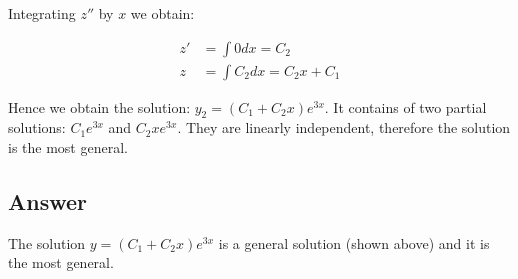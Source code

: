 Integrating $z''$ by $x$ we obtain:

\begin{displaymath}
    \begin{aligned}
        z' & = \int 0 dx = C_2 \\
        z & = \int C_2 dx = C_2 x + C_1
    \end{aligned}
\end{displaymath}

Hence we obtain the solution: $y_2 = (C_1 + C_2x)e^{3x}$. It contains of two partial solutions: $C_1 e^{3x}$ and $C_2x e^{3x}$. They are linearly independent, therefore the solution is the most general.

\subsection*{Answer}

The solution $y = (C_1 + C_2x)e^{3x}$ is a general solution (shown above) and it is the most general.
